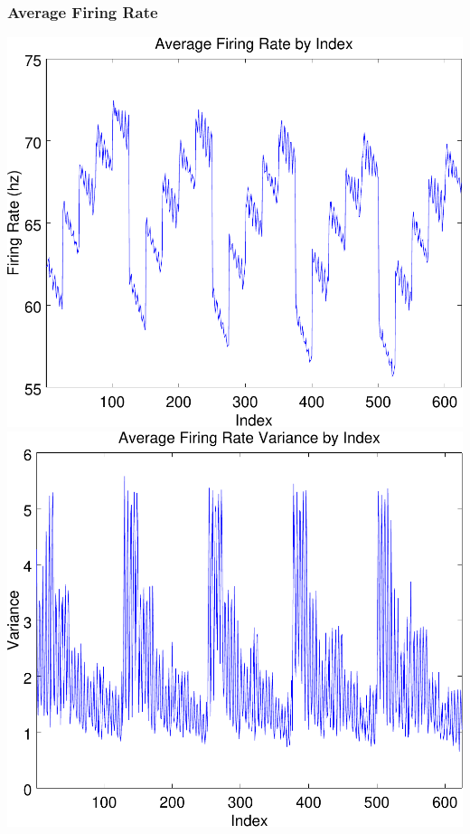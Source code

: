 \documentclass{beamer}
\theoremstyle{plain}
\theoremstyle{definition}
\begin{document}
\begin{frame}\frametitle{Average Firing Rate}
  \begin{center}
    \includegraphics[scale=.32]{AverageFiringRate.pdf}%
    \includegraphics[scale=.32]{AverageFiringRateVariance.pdf}
  \end{center}
\end{frame}
\end{document}
